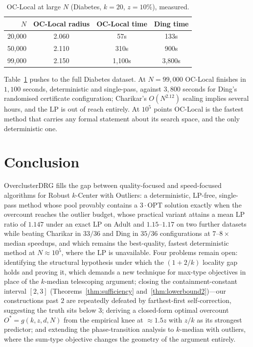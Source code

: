 \documentclass[twoside,leqno,twocolumn]{article}
\newcommand{\OPT}{\mathrm{OPT}}
\begin{document}
\begin{table}[t]
\caption{OC-Local at large $N$ (Diabetes, $k=20$, $z=10\%$), measured.}
\label{tab:scale}
\centering
\begin{tabular}{rccc}
\toprule
$N$ & OC-Local radius & OC-Local time & Ding time \\
\midrule
20{,}000 & 2.060 & 57s & 133s \\
50{,}000 & 2.110 & 310s & 900s \\
99{,}000 & 2.150 & 1{,}100s & 3{,}800s \\
\bottomrule
\end{tabular}
\end{table}

Table~\ref{tab:scale} pushes to the full Diabetes dataset. At
$N=99{,}000$ OC-Local finishes in $1{,}100$ seconds, deterministic and
single-pass, against $3{,}800$ seconds for Ding's randomised
certificate configuration; Charikar's $O(N^{2.12})$ scaling implies
several hours, and the LP is out of reach entirely. At $10^{5}$ points
OC-Local is the fastest method that carries any formal statement about
its search space, and the only deterministic one.

\section{Conclusion}

OverclusterDRG fills the gap between quality-focused and
speed-focused algorithms for Robust $k$-Center with Outliers: a
deterministic, LP-free, single-pass method whose pool provably
contains a $3\cdot\OPT$ solution exactly when the overcount reaches
the outlier budget, whose practical variant attains a mean LP ratio of
$1.147$ under an exact LP on Adult and $1.15$--$1.17$ on two further
datasets while beating Charikar in $33/36$ and Ding in $35/36$
configurations at $7$--$8\times$ median speedups, and which remains the
best-quality, fastest deterministic method at $N\approx 10^{5}$, where
the LP is unavailable. Four problems remain open: identifying the
structural hypothesis under which the $(1+2/k)$ locality gap holds and
proving it, which demands a new technique for max-type objectives in
place of the $k$-median telescoping argument; closing the
containment-constant interval $[2,3]$ (Theorems~\ref{thm:sufficiency}
and~\ref{thm:lowerbound2})---our constructions past $2$ are repeatedly
defeated by farthest-first self-correction, suggesting the truth sits
below $3$; deriving a closed-form optimal overcount
$O^{*}=g(k,z,d,N)$ from the empirical knee at ${\approx}1.5z$ with
$z/k$ as its strongest predictor; and extending the phase-transition
analysis to $k$-median with outliers, where the sum-type objective
changes the geometry of the argument entirely.
\end{document}
